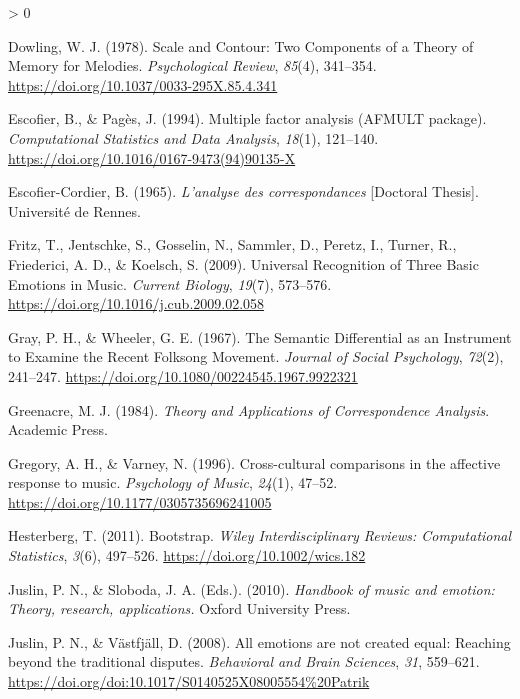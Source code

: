 \documentclass[
  english,
  man,floatsintext]{apa6}
\newlength{\cslhangindent}
\newenvironment{CSLReferences}[2] %
 {%
  \setlength{\parindent}{0pt}
  \ifodd #1 \everypar{\setlength{\hangindent}{\cslhangindent}}\ignorespaces\fi
  \ifnum #2 > 0
  \setlength{\parskip}{#2\baselineskip}
  \fi
 }%
 {}
\begin{document}
\begin{CSLReferences}{1}{0}
\leavevmode\hypertarget{ref-Dowling1978a}{}%
Dowling, W. J. (1978). {Scale and Contour: Two Components of a Theory of Memory for Melodies}. \emph{Psychological Review}, \emph{85}(4), 341--354. \url{https://doi.org/10.1037/0033-295X.85.4.341}

\leavevmode\hypertarget{ref-Escofier1994}{}%
Escofier, B., \& Pagès, J. (1994). {Multiple factor analysis (AFMULT package)}. \emph{Computational Statistics and Data Analysis}, \emph{18}(1), 121--140. \url{https://doi.org/10.1016/0167-9473(94)90135-X}

\leavevmode\hypertarget{ref-Escofier-Cordier1965}{}%
Escofier-Cordier, B. (1965). \emph{{L'analyse des correspondances}} {[}Doctoral Thesis{]}. Universit{é} de Rennes.

\leavevmode\hypertarget{ref-Fritz2009}{}%
Fritz, T., Jentschke, S., Gosselin, N., Sammler, D., Peretz, I., Turner, R., Friederici, A. D., \& Koelsch, S. (2009). {Universal Recognition of Three Basic Emotions in Music}. \emph{Current Biology}, \emph{19}(7), 573--576. \url{https://doi.org/10.1016/j.cub.2009.02.058}

\leavevmode\hypertarget{ref-Gray1967}{}%
Gray, P. H., \& Wheeler, G. E. (1967). {The Semantic Differential as an Instrument to Examine the Recent Folksong Movement}. \emph{Journal of Social Psychology}, \emph{72}(2), 241--247. \url{https://doi.org/10.1080/00224545.1967.9922321}

\leavevmode\hypertarget{ref-Greenacre1984}{}%
Greenacre, M. J. (1984). \emph{{Theory and Applications of Correspondence Analysis}}. Academic Press.

\leavevmode\hypertarget{ref-Gregory1996}{}%
Gregory, A. H., \& Varney, N. (1996). {Cross-cultural comparisons in the affective response to music}. \emph{Psychology of Music}, \emph{24}(1), 47--52. \url{https://doi.org/10.1177/0305735696241005}

\leavevmode\hypertarget{ref-Hesterberg2011}{}%
Hesterberg, T. (2011). {Bootstrap}. \emph{Wiley Interdisciplinary Reviews: Computational Statistics}, \emph{3}(6), 497--526. \url{https://doi.org/10.1002/wics.182}

\leavevmode\hypertarget{ref-Juslin2010}{}%
Juslin, P. N., \& Sloboda, J. A. (Eds.). (2010). \emph{{Handbook of music and emotion: Theory, research, applications.}} Oxford University Press.

\leavevmode\hypertarget{ref-Juslin2008a}{}%
Juslin, P. N., \& Västfjäll, D. (2008). {All emotions are not created equal: Reaching beyond the traditional disputes}. \emph{Behavioral and Brain Sciences}, \emph{31}, 559--621. \url{https://doi.org/doi:10.1017/S0140525X08005554\%20Patrik}


\end{CSLReferences}
\end{document}
